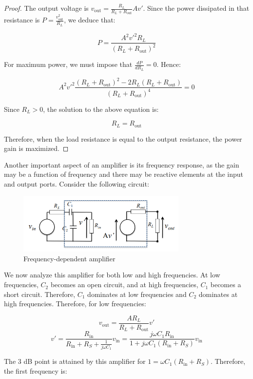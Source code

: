\documentclass{article}
\begin{document}
\begin{proof}
    The output voltage is $v_{\text{out}} = \frac{R_L}{R_L + R_{\text{out}}}Av'$. Since the power dissipated in that resistance is $P = \frac{v_{\text{out}}^2}{R_L}$, we deduce that:

    \[ P = \frac{A^2v'^2R_L}{(R_L + R_{\text{out}})^2} \]

    For maximum power, we must impose that $\frac{dP}{dR_L} = 0$. Hence:

    \[ A^2v'^2 \frac{(R_L + R_{\text{out}})^2 - 2R_L(R_L + R_{\text{out}})}{(R_L + R_{\text{out}})^4} = 0 \]

    Since $R_L > 0$, the solution to the above equation is:

    \[ R_L = R_{\text{out}} \]

    Therefore, when the load resistance is equal to the output resistance, the power gain is maximized.
\end{proof}

Another important aspect of an amplifier is its frequency response, as the gain may be a function of frequency and there may be reactive elements at the input and output ports. Consider the following circuit:

\begin{figure}[h]
    \centering
    \includegraphics[width=0.75\textwidth]{images/amplifier2.png}
    \caption{Frequency-dependent amplifier}
    \label{fig:amplifier2}
\end{figure}

We now analyze this amplifier for both low and high frequencies. At low frequencies, $C_2$ becomes an open circuit, and at high frequencies, $C_1$ becomes a short circuit. Therefore, $C_1$ dominates at low frequencies and $C_2$ dominates at high frequencies. Therefore, for low frequencies:

\[ v_{\text{out}} = \frac{AR_L}{R_L + R_{\text{out}}}v' \]
\[ v' = \frac{R_{\text{in}}}{R_{\text{in}} + R_S + \frac{1}{j\omega C_1}}v_{\text{in}} = \frac{j\omega C_1R_{\text{in}}}{1 + j\omega C_1(R_{\text{in}} + R_S)}v_{\text{in}} \]

The $3$ dB point is attained by this amplifier for $1 = \omega C_1(R_{\text{in}} + R_S)$. Therefore, the first frequency is:
\end{document}
